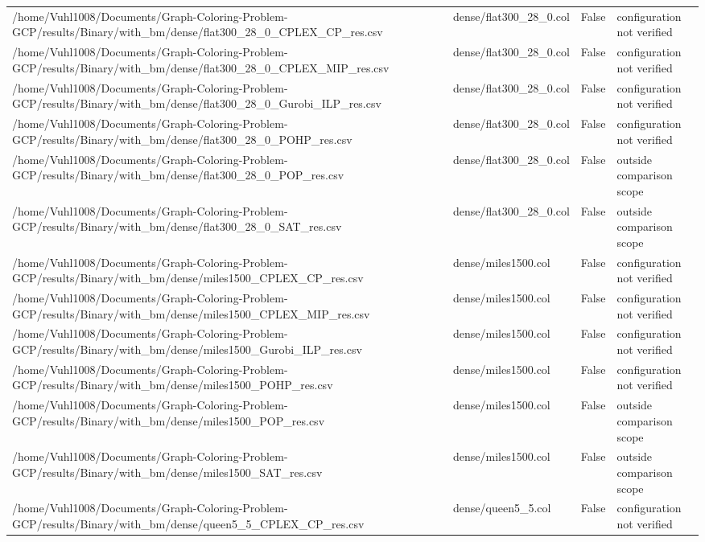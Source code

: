 \begin{table}[htbp]
\begin{tabular}{llll}
/home/Vuhl1008/Documents/Graph-Coloring-Problem-GCP/results/Binary/with\_bm/dense/flat300\_28\_0\_CPLEX\_CP\_res.csv & dense/flat300\_28\_0.col & False & configuration not verified \\
/home/Vuhl1008/Documents/Graph-Coloring-Problem-GCP/results/Binary/with\_bm/dense/flat300\_28\_0\_CPLEX\_MIP\_res.csv & dense/flat300\_28\_0.col & False & configuration not verified \\
/home/Vuhl1008/Documents/Graph-Coloring-Problem-GCP/results/Binary/with\_bm/dense/flat300\_28\_0\_Gurobi\_ILP\_res.csv & dense/flat300\_28\_0.col & False & configuration not verified \\
/home/Vuhl1008/Documents/Graph-Coloring-Problem-GCP/results/Binary/with\_bm/dense/flat300\_28\_0\_POHP\_res.csv & dense/flat300\_28\_0.col & False & configuration not verified \\
/home/Vuhl1008/Documents/Graph-Coloring-Problem-GCP/results/Binary/with\_bm/dense/flat300\_28\_0\_POP\_res.csv & dense/flat300\_28\_0.col & False & outside comparison scope \\
/home/Vuhl1008/Documents/Graph-Coloring-Problem-GCP/results/Binary/with\_bm/dense/flat300\_28\_0\_SAT\_res.csv & dense/flat300\_28\_0.col & False & outside comparison scope \\
/home/Vuhl1008/Documents/Graph-Coloring-Problem-GCP/results/Binary/with\_bm/dense/miles1500\_CPLEX\_CP\_res.csv & dense/miles1500.col & False & configuration not verified \\
/home/Vuhl1008/Documents/Graph-Coloring-Problem-GCP/results/Binary/with\_bm/dense/miles1500\_CPLEX\_MIP\_res.csv & dense/miles1500.col & False & configuration not verified \\
/home/Vuhl1008/Documents/Graph-Coloring-Problem-GCP/results/Binary/with\_bm/dense/miles1500\_Gurobi\_ILP\_res.csv & dense/miles1500.col & False & configuration not verified \\
/home/Vuhl1008/Documents/Graph-Coloring-Problem-GCP/results/Binary/with\_bm/dense/miles1500\_POHP\_res.csv & dense/miles1500.col & False & configuration not verified \\
/home/Vuhl1008/Documents/Graph-Coloring-Problem-GCP/results/Binary/with\_bm/dense/miles1500\_POP\_res.csv & dense/miles1500.col & False & outside comparison scope \\
/home/Vuhl1008/Documents/Graph-Coloring-Problem-GCP/results/Binary/with\_bm/dense/miles1500\_SAT\_res.csv & dense/miles1500.col & False & outside comparison scope \\
/home/Vuhl1008/Documents/Graph-Coloring-Problem-GCP/results/Binary/with\_bm/dense/queen5\_5\_CPLEX\_CP\_res.csv & dense/queen5\_5.col & False & configuration not verified \\

\end{tabular}
\end{table}
